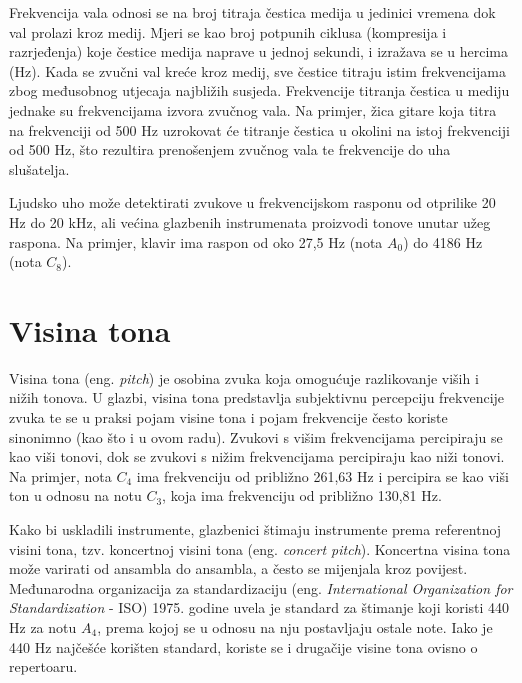 \documentclass[times, utf8, diplomski, numeric]{fer}
\begin{document}
Frekvencija vala odnosi se na broj titraja čestica medija u jedinici vremena dok val prolazi kroz medij. Mjeri se kao broj potpunih ciklusa (kompresija i razrjeđenja) koje čestice medija naprave u jednoj sekundi, i izražava se u hercima (Hz). Kada se zvučni val kreće kroz medij, sve čestice titraju istim frekvencijama zbog međusobnog utjecaja najbližih susjeda. Frekvencije titranja čestica u mediju jednake su frekvencijama izvora zvučnog vala. Na primjer, žica gitare koja titra na frekvenciji od 500 Hz uzrokovat će titranje čestica u okolini na istoj frekvenciji od 500 Hz, što rezultira prenošenjem zvučnog vala te frekvencije do uha slušatelja.

Ljudsko uho može detektirati zvukove u frekvencijskom rasponu od otprilike 20 Hz do 20 kHz, ali većina glazbenih instrumenata proizvodi tonove unutar užeg raspona. Na primjer, klavir ima raspon od oko 27,5 Hz (nota $A_0$) do 4186 Hz (nota $C_8$).


\section{Visina tona}
Visina tona (eng. \textit{pitch}) je osobina zvuka koja omogućuje razlikovanje viših i nižih tonova. U glazbi, visina tona predstavlja subjektivnu percepciju frekvencije zvuka te se u praksi pojam visine tona i pojam frekvencije često koriste sinonimno (kao što i u ovom radu).\cite{stevens1940relation} Zvukovi s višim frekvencijama percipiraju se kao viši tonovi, dok se zvukovi s nižim frekvencijama percipiraju kao niži tonovi. Na primjer, nota $C_4$ ima frekvenciju od približno 261,63 Hz i percipira se kao viši ton u odnosu na notu $C_3$, koja ima frekvenciju od približno 130,81 Hz.

Kako bi uskladili instrumente, glazbenici štimaju instrumente prema referentnoj visini tona, tzv. koncertnoj visini tona (eng. \textit{concert pitch}). Koncertna visina tona može varirati od ansambla do ansambla, a često se mijenjala kroz povijest. Međunarodna organizacija za standardizaciju (eng. \textit{International Organization for Standardization} - ISO) 1975. godine uvela je standard za štimanje koji koristi 440 Hz za notu $A_4$, prema kojoj se u odnosu na nju postavljaju ostale note.\cite{iso161975} Iako je 440 Hz najčešće korišten standard, koriste se i drugačije visine tona ovisno o repertoaru.
\end{document}
